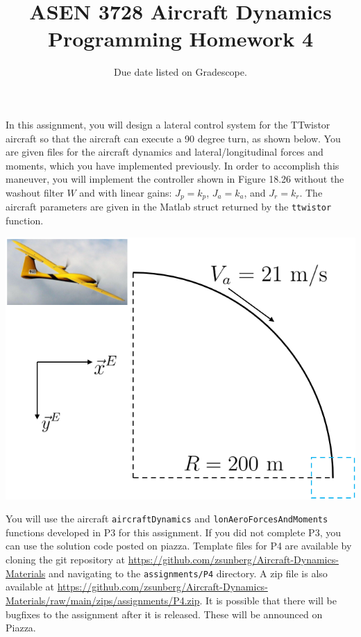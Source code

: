 \documentclass{article}
\title{ASEN 3728 Aircraft Dynamics\\Programming Homework 4}
\date{Due date listed on Gradescope.}
\theoremstyle{definition}
\begin{document}
\maketitle

In this assignment, you will design a lateral control system for the TTwistor aircraft so that the aircraft can execute a 90 degree turn, as shown below. You are given files for the aircraft dynamics and lateral/longitudinal forces and moments, which you have implemented previously.
In order to accomplish this maneuver, you will implement the controller shown in Figure 18.26 without the washout filter $W$ and with linear gains: $J_p = k_p$, $J_a = k_a$, and $J_r = k_r$. 
The aircraft parameters are given in the Matlab struct returned by the \texttt{ttwistor} function.

\begin{center}
    \includegraphics[scale=0.5]{turn.png}
\end{center}

You will use the aircraft \texttt{aircraftDynamics} and \texttt{lonAeroForcesAndMoments} functions developed in P3 for this assignment. If you did not complete P3, you can use the solution code posted on piazza. Template files for P4 are available by cloning the git repository at \url{https://github.com/zsunberg/Aircraft-Dynamics-Materials} and navigating to the \texttt{assignments/P4} directory. A zip file is also available at \url{https://github.com/zsunberg/Aircraft-Dynamics-Materials/raw/main/zips/assignments/P4.zip}. It is possible that there will be bugfixes to the assignment after it is released. These will be announced on Piazza.
\end{document}
